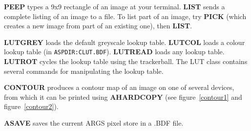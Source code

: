 {\bf PEEP} types a 9x9 rectangle of an image at your terminal.
{\bf LIST} sends a complete listing of an image to a file.
To list part of an image, try {\bf PICK} (which creates a new image from part
of an existing one), then {\bf LIST}.

{\bf LUTGREY} loads the default greyscale lookup table.
{\bf LUTCOL} loads a colour lookup table (in {\tt ASPDIR:\-CLUT.\-BDF}).
{\bf LUTREAD} loads any lookup table.
{\bf LUTROT} cycles the lookup table using the trackerball.
The LUT class contains several commands for manipulating the lookup table.

{\bf CONTOUR} produces a contour map of an image on one of several devices,
from which it can be printed using {\bf AHARDCOPY} (see figure~\ref{contour1}
and figure~\ref{contour2}).

{\bf ASAVE} saves the current ARGS pixel store in a .BDF file.

